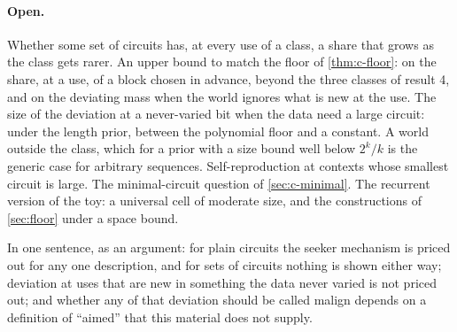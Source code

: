 \paragraph{Open.} Whether some set of circuits has, at every use of a class, a share that grows as the class
gets rarer. An upper bound to match the floor of \cref{thm:c-floor}: on the share, at a use, of a block chosen
in advance, beyond the three classes of result 4, and on the deviating mass when the world ignores what is new
at the use. The size of the deviation at a never-varied bit when the data need a large circuit: under the
length prior, between the polynomial floor and a constant. A world outside the class, which for a prior with
a size bound well below $2^k/k$ is the generic case for arbitrary sequences. Self-reproduction at
contexts whose smallest circuit is large. The minimal-circuit question of \cref{sec:c-minimal}. The recurrent
version of the toy: a universal cell of moderate size, and the constructions of \cref{sec:floor} under a space
bound.

In one sentence, as an argument: for plain circuits the seeker mechanism is priced out for any one
description, and for sets of circuits nothing is shown either way; deviation at uses that are new in something
the data never varied is not priced out; and whether any of that deviation should be called malign depends on
a definition of ``aimed'' that this material does not supply.
